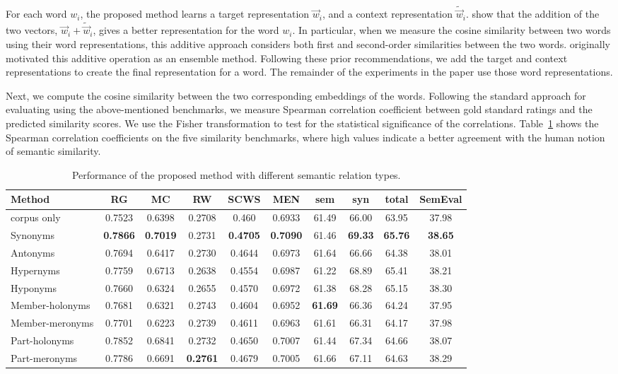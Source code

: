 \documentclass[letterpaper]{article}
\begin{document}
For each word $w_i$, the proposed method learns a target representation $\vec{w}_i$, and a context representation $\tilde{\vec{w}}_i$.
\cite{Levy:TACL:2015} show that the addition of the two vectors, $\vec{w}_i + \tilde{\vec{w}}_i$, gives a better 
representation for the word $w_i$. In particular, when we measure the cosine similarity between two words using
their word representations, this additive approach considers both first and second-order similarities between the two words.
\cite{Pennington:EMNLP:2014} originally motivated this additive operation as an ensemble method.
Following these prior recommendations, we add the target and context representations to create the final representation for a word.
The remainder of the experiments in the paper use those word representations.

Next, we compute the cosine similarity between the two corresponding
embeddings of the words. Following the standard approach for evaluating using the above-mentioned benchmarks,
we measure Spearman correlation coefficient between gold standard ratings and the predicted similarity scores.
We use the Fisher transformation to test for the statistical significance of the correlations.
Table~\ref{tbl:overall} shows the Spearman correlation coefficients  on the five similarity benchmarks,
where high values indicate a better agreement with the human notion of semantic similarity.

\begin{table}[t!]
\small
\centering
\caption{Performance of the proposed method with different semantic relation types.}
\label{tbl:overall}
\begin{tabular}{|l|c|c|c|c|c|c|c|c|c|} \hline
Method & RG & MC & RW & SCWS & MEN & sem & syn & total & SemEval \\ \hline \hline
corpus only  & 0.7523 & 0.6398 & 0.2708 & 0.460 & 0.6933 & 61.49 & 66.00 & 63.95 & 37.98 \\
Synonyms & \textbf{0.7866} & \textbf{0.7019} & 0.2731 & \textbf{0.4705} & \textbf{0.7090} & 61.46 & \textbf{69.33} & \textbf{65.76} & \textbf{38.65} \\
Antonyms & 0.7694 & 0.6417 & 0.2730 & 0.4644 & 0.6973 & 61.64 & 66.66 & 64.38 & 38.01 \\
Hypernyms & 0.7759 & 0.6713 & 0.2638 & 0.4554 & 0.6987 & 61.22 & 68.89 & 65.41 & 38.21 \\
Hyponyms & 0.7660 & 0.6324 & 0.2655 & 0.4570 & 0.6972 & 61.38 & 68.28 & 65.15 & 38.30 \\
Member-holonyms & 0.7681 & 0.6321 & 0.2743 & 0.4604 & 0.6952 & \textbf{61.69} & 66.36 & 64.24 & 37.95 \\
Member-meronyms & 0.7701 & 0.6223 & 0.2739 & 0.4611 & 0.6963 & 61.61 & 66.31 & 64.17 & 37.98 \\
Part-holonyms & 0.7852 & 0.6841 & 0.2732 & 0.4650 & 0.7007 & 61.44 & 67.34 & 64.66 & 38.07 \\
Part-meronyms & 0.7786 & 0.6691 & \textbf{0.2761} & 0.4679 & 0.7005 & 61.66 & 67.11 & 64.63 & 38.29 \\
 \hline
\end{tabular}
\vspace{-3mm}
\end{table}
\end{document}
